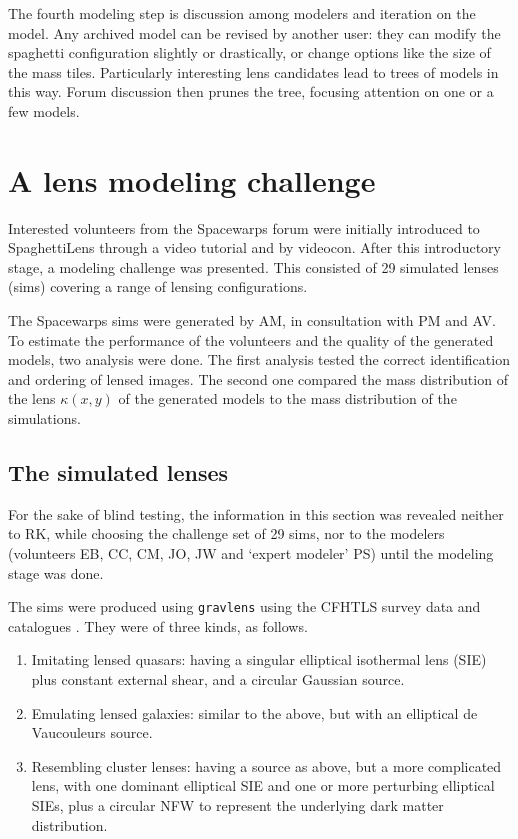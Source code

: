 \documentclass[12pt,preprint]{aastex}
\newcommand{\spl}{SpaghettiLens\xspace}
\newcommand{\sw}{Spacewarps\xspace}
\begin{document}
The fourth modeling step is discussion among modelers and iteration
on the model.  Any archived model can be revised by another user: they
can modify the spaghetti configuration slightly or drastically, or
change options like the size of the mass tiles.  Particularly
interesting lens candidates lead to trees of models in this way.
Forum discussion then prunes the tree, focusing attention on one or a
few models.

\section{A lens modeling challenge} \label{sec:mod_challenge}

Interested volunteers from the \sw forum were initially introduced to
\spl through a video tutorial and by videocon.  After this
introductory stage, a modeling challenge was presented.  This
consisted of 29 simulated lenses (sims) covering a range of lensing
configurations.

The \sw sims were generated by AM, in consultation with PM and AV.
To estimate the performance of the volunteers and the quality of the generated models, two analysis  were done.
The first analysis tested the correct identification and ordering of lensed images.
The second one compared the mass distribution of the lens $\kappa(x, y)$ of the generated models to the mass distribution of the simulations.


\subsection{The simulated lenses} \label{sec:sims}

For the sake of blind testing, the information in this section was
revealed neither to RK, while choosing the challenge set of 29 sims,
nor to the modelers (volunteers EB, CC, CM, JO, JW and `expert
modeler' PS) until the modeling stage was done.

The sims were produced using {\tt gravlens}
\citep{2001astro.ph..2341K,2001astro.ph..2340K} using the CFHTLS survey data
and catalogues \cite{Coupon2009}. They were of three
kinds, as follows.

\begin{enumerate}
  \item Imitating lensed quasars: having a singular elliptical
    isothermal lens (SIE) plus constant external shear, and a circular
    Gaussian source.
  \item Emulating lensed galaxies: similar to the above, but with an
    elliptical de Vaucouleurs source.
  \item Resembling cluster lenses: having a source as above, but a
    more complicated lens, with one dominant elliptical SIE and
    one or more perturbing elliptical SIEs, plus a circular NFW
    \citep{1996ApJ...462..563N,1997ApJ...490..493N} to represent
    the underlying dark matter distribution.
\end{enumerate}
\end{document}
